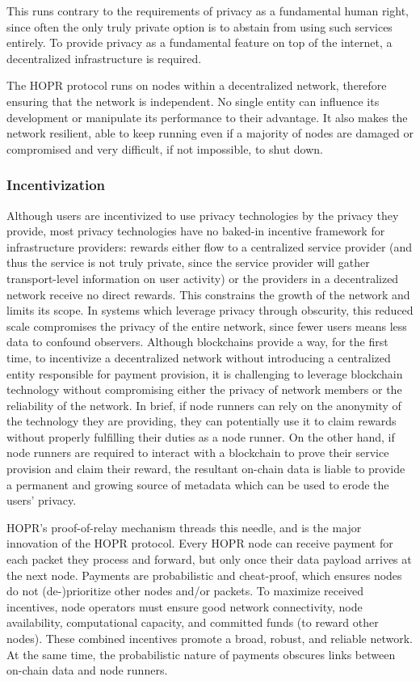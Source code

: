 This runs contrary to the requirements of privacy as a fundamental human right, since often the only truly private option is to abstain from using such services entirely. To provide privacy as a fundamental feature on top of the internet, a decentralized infrastructure is required.

The HOPR protocol runs on nodes within a decentralized network, therefore ensuring that the network is independent. No single entity can influence its development or manipulate its performance to their advantage. It also makes the network resilient, able to keep running even if a majority of nodes are damaged or compromised and very difficult, if not impossible, to shut down.

\subsubsection{Incentivization}
Although users are incentivized to use privacy technologies by the privacy they provide, most privacy technologies have no baked-in incentive framework for infrastructure providers: rewards either flow to a centralized service provider (and thus the service is not truly private, since the service provider will gather transport-level information on user activity) or the providers in a decentralized network receive no direct rewards. This constrains the growth of the network and limits its scope. In systems which leverage privacy through obscurity, this reduced scale compromises the privacy of the entire network, since fewer users means less data to confound observers. Although blockchains provide a way, for the first time, to incentivize a decentralized network without introducing a centralized entity responsible for payment provision, it is challenging to leverage blockchain technology without compromising either the privacy of network members or the reliability of the network. In brief, if node runners can rely on the anonymity of the technology they are providing, they can potentially use it to claim rewards without properly fulfilling their duties as a node runner. On the other hand, if node runners are required to interact with a blockchain to prove their service provision and claim their reward, the resultant on-chain data is liable to provide a permanent and growing source of metadata which can be used to erode the users' privacy.

HOPR's proof-of-relay mechanism threads this needle, and is the major innovation of the HOPR protocol. Every HOPR node can receive payment for each packet they process and forward, but only once their data payload arrives at the next node. Payments are probabilistic and cheat-proof, which ensures nodes do not (de-)prioritize other nodes and/or packets. To maximize received incentives, node operators must ensure good network connectivity, node availability, computational capacity, and committed funds (to reward other nodes). These combined incentives promote a broad, robust, and reliable network. At the same time, the probabilistic nature of payments obscures links between on-chain data and node runners.

